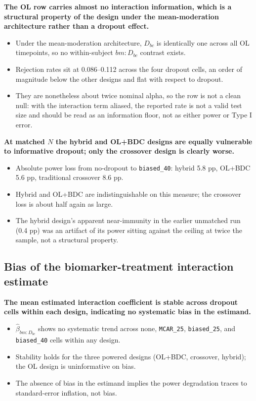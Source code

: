 \documentclass[
  11pt,
]{article}
\newcounter{none} %
\begin{document}
\textbf{The OL row carries almost no interaction information, which is a structural property of the design under the mean-moderation architecture rather than a dropout effect.}

\begin{itemize}\setlength{\itemsep}{2pt}\setlength{\parskip}{0pt}
\item Under the mean-moderation architecture, $D_{bc}$ is identically one across all OL timepoints, so no within-subject $bm{:}D_{bc}$ contrast exists.
\item Rejection rates sit at 0.086--0.112 across the four dropout cells, an order of magnitude below the other designs and flat with respect to dropout.
\item They are nonetheless about twice nominal alpha, so the row is not a clean null: with the interaction term aliased, the reported rate is not a valid test size and should be read as an information floor, not as either power or Type I error.
\end{itemize}

\textbf{At matched $N$ the hybrid and OL+BDC designs are equally vulnerable to informative dropout; only the crossover design is clearly worse.}

\begin{itemize}\setlength{\itemsep}{2pt}\setlength{\parskip}{0pt}
\item Absolute power loss from no-dropout to \texttt{biased\_40}: hybrid 5.8 pp, OL+BDC 5.6 pp, traditional crossover 8.6 pp.
\item Hybrid and OL+BDC are indistinguishable on this measure; the crossover loss is about half again as large.
\item The hybrid design's apparent near-immunity in the earlier unmatched run (0.4 pp) was an artifact of its power sitting against the ceiling at twice the sample, not a structural property.
\end{itemize}

\subsection{Bias of the biomarker-treatment interaction estimate}\label{bias-of-the-biomarker-treatment-interaction-estimate}

\textbf{The mean estimated interaction coefficient is stable across dropout cells within each design, indicating no systematic bias in the estimand.}

\begin{itemize}\setlength{\itemsep}{2pt}\setlength{\parskip}{0pt}
\item $\hat\beta_{bm:D_{bc}}$ shows no systematic trend across none, \texttt{MCAR\_25}, \texttt{biased\_25}, and \texttt{biased\_40} cells within any design.
\item Stability holds for the three powered designs (OL+BDC, crossover, hybrid); the OL design is uninformative on bias.
\item The absence of bias in the estimand implies the power degradation traces to standard-error inflation, not bias.
\end{itemize}
\end{document}
